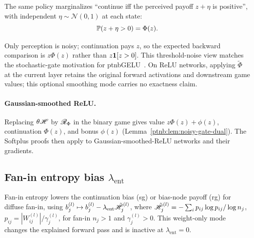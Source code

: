 \begin{remark}\label{ptnb:rem:noisy-gate-perception}
The same policy marginalizes ``continue iff the perceived payoff $z+\eta$ is positive'', with
independent $\eta\sim\mathcal N(0,1)$ at each state:
\begin{equation}\label{ptnb:eq:noisy-gate-marginal}
    \P(z+\eta>0)=\Phi(z).
\end{equation}
{\setlength{\emergencystretch}{1em}%
Only perception is noisy; continuation pays $z$, so the expected backward comparison is
$z\Phi(z)$ rather than $z\1[z>0]$. This threshold-noise view matches the stochastic-gate motivation
for \acs{ptnbGELU}~\parencite{Hendrycks2016}. On ReLU networks, applying $\tilde\Phi$ at the current
layer retains the original forward activations and downstream game values; this optional smoothing
mode carries no exactness claim.\par}
\end{remark}

\paragraph{Gaussian-smoothed ReLU.}
Replacing $\theta\Entropy$ by $\RegBonus_\Phi$ in the binary game gives value $z\Phi(z)+\phi(z)$, continuation $\Phi(z)$, and bonus $\phi(z)$ (Lemma~\ref{ptnb:lem:noisy-gate-dual}). The Softplus proofs then apply to Gaussian-smoothed-ReLU networks and their gradients.


\subsection{\texorpdfstring{Fan-in entropy bias $\lambda_{\mathrm{ent}}$}{Fan-in entropy bias lambda\_ent}}\label{ptnb:app:entropy-mode}

Fan-in entropy lowers the continuation bias (\ac{sg}) or bias-node payoff (\ac{rg}) for diffuse
fan-in, using $b_j^{(l)}\mapsto b_j^{(l)}-\lambda_{\mathrm{ent}}\tilde{\Entropy}_j^{(l)}$, where
$\tilde{\Entropy}_j^{(l)}=-\sum_i p_{ij}\log p_{ij}/\log n_j$,
$p_{ij}=|W_{ij}^{(l)}|/\gamma_j^{(l)}$, for fan-in $n_j>1$ and $\gamma_j^{(l)}>0$. This weight-only mode changes the explained forward pass and is inactive at $\lambda_{\mathrm{ent}}=0$.

